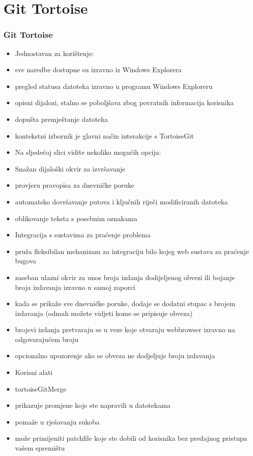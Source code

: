 \section{Git Tortoise}
\begin{frame}[allowframebreaks]
\frametitle{Git Tortoise}
\begin{itemize}
\item Jednostavan za korištenje:
\item sve naredbe dostupne su izravno iz Windows Explorera 
\item pregled statusa datoteka izravno u programu Windows Exploreru
\item opisni dijalozi, stalno se poboljšava zbog povratnih informacija korisnika
\item dopušta premještanje datoteka
\framebreak
\item kontekstni izbornik je glavni način interakcije s TortoiseGit
 \item Na sljedećoj slici vidite nekoliko mogućih opcija: 
 \framebreak
 \item Snažan dijaloški okvir za izvršavanje 
 \item provjeru pravopisa za dnevničke poruke
 \item automatsko dovršavanje putova i ključnih riječi modificiranih datoteka
 \item oblikovanje teksta s posebnim oznakama
 \framebreak
 \item  Integracija s sustavima za praćenje problema
 \item pruža fleksibilan mehanizam za integraciju bilo kojeg web sustava za praćenje bugova
 \item zaseban ulazni okvir za unos broja izdanja dodijeljenog obvezi ili bojanje broja izdavanja izravno u samoj zaporci
 \item kada se prikaže sve dnevničke poruke, dodaje se dodatni stupac s brojem izdavanja (odmah možete vidjeti kome se pripisuje obveza)
 \item brojevi izdanja pretvaraju se u veze koje otvaraju webbrowser izravno na odgovarajućem broju
 \item opcionalno upozorenje ako se obveza ne dodjeljuje broju izdavanja
 \framebreak
 \item Korisni alati
 \item tortoiseGitMerge 
 \item prikazuje promjene koje ste napravili u datotekama
 \item pomaže u rješavanju sukoba
 \item može primijeniti patchfile koje ste dobili od korisnika bez predajnog pristupa vašem spremištu

\end{itemize}
\end{frame}
